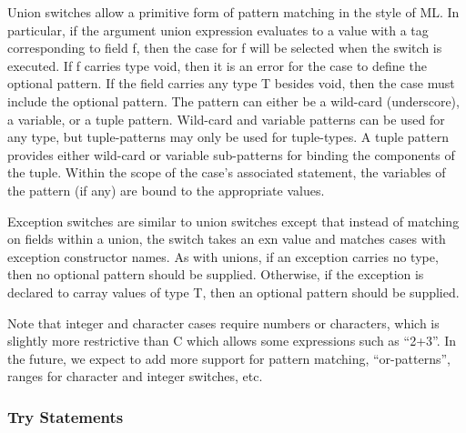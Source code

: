 \documentclass[titlepage,10pt]{article}
\begin{document}
Union switches allow a primitive form of pattern matching in the style
of ML.  In particular, if the argument union expression evaluates to a
value with a tag corresponding to field f, then the case for f will be
selected when the switch is executed.  If f carries type void, then it
is an error for the case to define the optional pattern.  If the field
carries any type T besides void, then the case must include the optional
pattern.  The pattern can either be a wild-card (underscore), a
variable, or a tuple pattern.  Wild-card and variable patterns can be
used for any type, but tuple-patterns may only be used for tuple-types.
A tuple pattern provides either wild-card or variable sub-patterns for
binding the components of the tuple.  Within the scope of the case's
associated statement, the variables of the pattern (if any) are bound to
the appropriate values.

Exception switches are similar to union switches except that instead of
matching on fields within a union, the switch takes an exn value and
matches cases with exception constructor names.  As with unions, if an
exception carries no type, then no optional pattern should be supplied.
Otherwise, if the exception is declared to carray values of type T, then
an optional pattern should be supplied.

Note that integer and character cases require numbers or characters,
which is slightly more restrictive than C which allows some expressions
such as ``2+3''.  In the future, we expect to add more support for
pattern matching, ``or-patterns'', ranges for character and integer
switches, etc.

\subsubsection{Try Statements}

\end{document}
